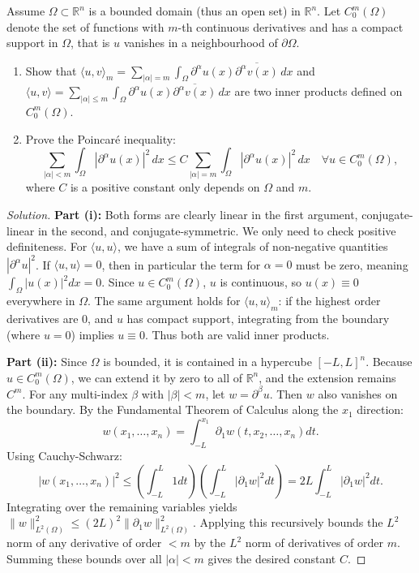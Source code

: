\documentclass{article}
\begin{document}
	\begin{problem}
		Assume $\Omega \subset \mathbb{R}^{n}$ is a bounded domain (thus an open set) in $\mathbb{R}^{n}$. Let $C_{0}^{m}(\Omega)$ denote the set of functions with $m$-th continuous derivatives and has a compact support in $\Omega$, that is $u$ vanishes in a neighbourhood of $\partial\Omega$.
		\begin{enumerate}
			\item[(i)] Show that $\langle u, v \rangle_{m} = \sum_{|\alpha|=m} \int_{\Omega} \partial^{\alpha}u(x) \overline{\partial^{\alpha}v(x)} \, dx$ and $\langle u, v \rangle = \sum_{|\alpha| \le m} \int_{\Omega} \partial^{\alpha}u(x) \overline{\partial^{\alpha}v(x)} \, dx$ are two inner products defined on $C_{0}^{m}(\Omega)$.
			\item[(ii)] Prove the Poincaré inequality:
			\[ \sum_{|\alpha|<m} \int_{\Omega} |\partial^{\alpha}u(x)|^{2} \, dx \le C \sum_{|\alpha|=m} \int_{\Omega} |\partial^{\alpha}u(x)|^{2} \, dx \quad \forall u \in C_{0}^{m}(\Omega), \]
			where $C$ is a positive constant only depends on $\Omega$ and $m$.
		\end{enumerate}
	\end{problem}
    \begin{proof}[Solution]
        \textbf{Part (i):} Both forms are clearly linear in the first argument, conjugate-linear in the second, and conjugate-symmetric. We only need to check positive definiteness. For $\langle u, u \rangle$, we have a sum of integrals of non-negative quantities $|\partial^\alpha u|^2$. If $\langle u, u \rangle = 0$, then in particular the term for $\alpha = 0$ must be zero, meaning $\int_\Omega |u(x)|^2 dx = 0$. Since $u \in C_0^m(\Omega)$, $u$ is continuous, so $u(x) \equiv 0$ everywhere in $\Omega$. The same argument holds for $\langle u, u \rangle_m$: if the highest order derivatives are 0, and $u$ has compact support, integrating from the boundary (where $u=0$) implies $u \equiv 0$. Thus both are valid inner products.

        \textbf{Part (ii):} Since $\Omega$ is bounded, it is contained in a hypercube $[-L, L]^n$. Because $u \in C_0^m(\Omega)$, we can extend it by zero to all of $\mathbb{R}^n$, and the extension remains $C^m$. For any multi-index $\beta$ with $|\beta| < m$, let $w = \partial^\beta u$. Then $w$ also vanishes on the boundary. By the Fundamental Theorem of Calculus along the $x_1$ direction:
        \[ w(x_1, \dots, x_n) = \int_{-L}^{x_1} \partial_1 w(t, x_2, \dots, x_n) dt. \]
        Using Cauchy-Schwarz:
        \[ |w(x_1, \dots, x_n)|^2 \le \left( \int_{-L}^L 1 dt \right) \left( \int_{-L}^L |\partial_1 w|^2 dt \right) = 2L \int_{-L}^L |\partial_1 w|^2 dt. \]
        Integrating over the remaining variables yields $\|w\|_{L^2(\Omega)}^2 \le (2L)^2 \|\partial_1 w\|_{L^2(\Omega)}^2$.
        Applying this recursively bounds the $L^2$ norm of any derivative of order $< m$ by the $L^2$ norm of derivatives of order $m$. Summing these bounds over all $|\alpha| < m$ gives the desired constant $C$.
    \end{proof}
\end{document}
